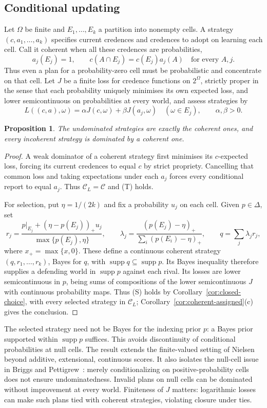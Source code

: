 \documentclass[11pt]{article}
\newtheorem{proposition}[theorem]{Proposition}
\theoremstyle{definition}
\newcommand{\C}{\mathcal C}
\newcommand{\supp}{\operatorname{supp}}
\begin{document}
\subsection{Conditional updating}
Let $\Omega$ be finite and $E_1,\ldots,E_k$ a partition into nonempty cells. A strategy $(c,a_1,\ldots,a_k)$ specifies current credences and credences to adopt on learning each cell. Call it coherent when all these credences are probabilities,
\[
a_j(E_j)=1,\qquad c(A\cap E_j)=c(E_j)a_j(A)\quad\text{for every }A,j.
\]
Thus even a plan for a probability-zero cell must be probabilistic and concentrate on that cell. Let $J$ be a finite loss for credence functions on $2^\Omega$, strictly proper in the sense that each probability uniquely minimises its own expected loss, and lower semicontinuous on probabilities at every world, and assess strategies by
\[
L((c,a),\omega)=\alpha J(c,\omega)+\beta J(a_j,\omega)
\quad(\omega\in E_j),\qquad \alpha,\beta>0.
\]
\begin{proposition}\label{prop:short-updating}
The undominated strategies are exactly the coherent ones, and every incoherent strategy is dominated by a coherent one.
\end{proposition}
\begin{proof}
A weak dominator of a coherent strategy first minimises its $c$-expected loss, forcing its current credences to equal $c$ by strict propriety. Cancelling that common loss and taking expectations under each $a_j$ forces every conditional report to equal $a_j$. Thus $\C_L=\C$ and (T) holds.

For selection, put $\eta=1/(2k)$ and fix a probability $u_j$ on each cell. Given $p\in\Delta$, set
\[
r_j=\frac{p|_{E_j}+(\eta-p(E_j))_+u_j}{\max\{p(E_j),\eta\}},\qquad
\lambda_j=\frac{(p(E_j)-\eta)_+}{\sum_i(p(E_i)-\eta)_+},\qquad
q=\sum_j\lambda_jr_j,
\]
where $x_+=\max\{x,0\}$. These define a continuous coherent strategy $(q,r_1,\ldots,r_k)$, Bayes for $q$, with $\supp q\subseteq\supp p$. Its Bayes inequality therefore supplies a defending world in $\supp p$ against each rival. Its losses are lower semicontinuous in $p$, being sums of compositions of the lower semicontinuous $J$ with continuous probability maps. Thus (S) holds by Corollary~\ref{cor:closed-choice}, with every selected strategy in $\C_L$; Corollary~\ref{cor:coherent-assigned}(c) gives the conclusion.
\end{proof}
The selected strategy need not be Bayes for the indexing prior $p$: a Bayes prior supported within $\supp p$ suffices. This avoids discontinuity of conditional probabilities at null cells. The result extends the finite-valued setting of Nielsen~\cite{Nielsen2021} beyond additive, extensional, continuous scores. It also isolates the null-cell issue in Briggs and Pettigrew~\cite{Briggs2020}: merely conditionalizing on positive-probability cells does not ensure undominatedness. Invalid plans on null cells can be dominated without improvement at every world. Finiteness of $J$ matters: logarithmic losses can make such plans tied with coherent strategies, violating closure under ties.
\end{document}
